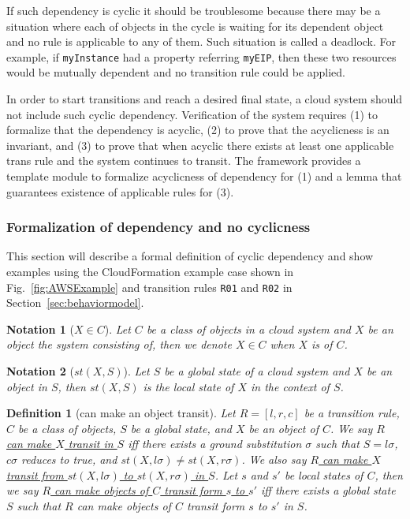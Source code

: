 \documentclass[12pt]{report}
\newtheorem{notation}{Notation}
\newtheorem{definition}{Definition}
\newcommand{\ul}{\underline}
\begin{document}
If such dependency is cyclic it should be troublesome because there
may be a situation where each of objects in the cycle is waiting for
its dependent object and no rule is applicable to any of them. Such
situation is called a deadlock.  For example, if {\tt myInstance} had
a property referring {\tt myEIP}, then these two resources would be
mutually dependent and no transition rule could be applied.

In order to start transitions and reach a desired final state, a cloud
system should not include such cyclic dependency. Verification of the
system requires (1) to formalize that the dependency is acyclic, (2)
to prove that the acyclicness is an invariant, and (3) to prove that
when acyclic there exists at least one applicable trans rule and the
system continues to transit. The framework provides a template module
to formalize acyclicness of dependency for (1) and a lemma that
guarantees existence of applicable rules for (3).

\subsubsection{Formalization of dependency and no cyclicness}
This section will describe a formal definition of cyclic dependency
and show examples using the CloudFormation example case shown in
Fig.~\ref{fig:AWSExample} and transition rules {\tt R01} and {\tt R02}
in Section~\ref{sec:behaviormodel}.

\begin{notation}[$X \in C$]
Let $C$ be a class of objects in a cloud system and $X$ be an object
the system consisting of, then we denote \ul{$X \in C$} when $X$ is of
$C$.
\end{notation}

\begin{notation}[$st(X,S)$]
Let $S$ be a global state of a cloud system and $X$ be an object in
$S$, then \ul{$st(X,S)$} is the local state of $X$ in the context of
$S$.
\end{notation}

\begin{definition}[can make an object transit]
Let $R = [l,r,c]$ be a transition rule, $C$ be a class of objects, $S$
be a global state, and $X$ be an object of $C$. We say \ul{$R$ can
  make $X$ transit in $S$} iff there exists a ground substitution
$\sigma$ such that $S = l\sigma$, $c\sigma$ reduces to true, and
$st(X,l\sigma) \ne st(X,r\sigma)$. We also say \ul{$R$ can make $X$
  transit from $st(X,l\sigma)$ to $st(X,r\sigma)$ in $S$}.  Let $s$
and $s'$ be local states of $C$, then we say \ul{$R$ can make objects
  of $C$ transit form $s$ to $s'$} iff there exists a global state $S$
such that $R$ can make objects of $C$ transit form $s$ to $s'$ in $S$.
\end{definition}
\end{document}
